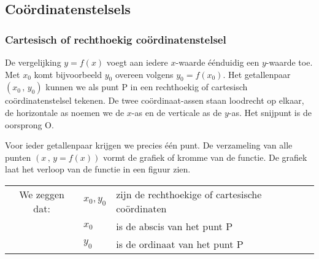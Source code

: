 


\subsection{Co\"ordinatenstelsels}


\subsubsection{Cartesisch of rechthoekig co\"ordinatenstelsel}

De vergelijking $y=f(x)$ voegt aan iedere $x$-waarde \'e\'enduidig een
$y$-waarde toe. Met $x_{0}$ komt bijvoorbeeld $y_{0}$ overeen volgens
$y_{0}=f(x_{0})$. Het getallenpaar $(x_{0}\,,\,y_{0})$ kunnen we
als punt P in een rechthoekig of cartesisch co\"ordinatenstelsel tekenen.
De twee co\"ordinaat-assen staan loodrecht op elkaar, de horizontale
as noemen we de $x$-as en de verticale as de $y$-as. Het snijpunt is de
oorsprong O.

Voor ieder getallenpaar krijgen we precies \'e\'en punt. De
verzameling van alle punten $(x\,,\,y=f(x))$ vormt de grafiek of
kromme van de functie. De grafiek laat het verloop van de functie
in een figuur zien.


\begin{figure}[H]
\centering

\end{figure}


\begin{tabel*}{}
	\centering
\begin{tabular}{cll}
	We zeggen dat: & $x_{0},y_{0}$  & zijn de rechthoekige of cartesische co\"ordinaten\\
	& $x_{0}$  & is de abscis van het punt P\\
	& $y_{0}$ & is de ordinaat van het punt P\\
\end{tabular}
\end{tabel*}

